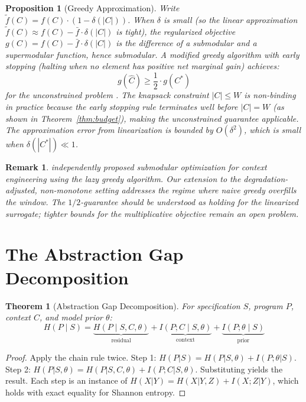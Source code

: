 \documentclass[11pt, a4paper, logo, copyright]{googledeepmind}
\newtheorem{theorem}{Theorem}[section]
\newtheorem{proposition}{Proposition}[section]
\newtheorem*{remark}{Remark}
\begin{document}
\begin{proposition}[Greedy Approximation]
\label{thm:greedy}
Write $\tilde{f}(C) = f(C) \cdot (1 - \delta(|C|))$. When $\delta$ is small (so the linear approximation $\tilde{f}(C) \approx f(C) - \bar{f} \cdot \delta(|C|)$ is tight), the regularized objective $g(C) = f(C) - \bar{f} \cdot \delta(|C|)$ is the difference of a submodular and a supermodular function, hence submodular. A modified greedy algorithm with early stopping (halting when no element has positive net marginal gain) achieves:
$$g(\hat{C}) \geq \frac{1}{2} \cdot g(C^*)$$
for the unconstrained problem \citep{buchbinder2015tight}. The knapsack constraint $|C| \leq W$ is non-binding in practice because the early stopping rule terminates well before $|C| = W$ (as shown in Theorem~\ref{thm:budget}), making the unconstrained guarantee applicable. The approximation error from linearization is bounded by $O(\delta^2)$, which is small when $\delta(|C^*|) \ll 1$.
\end{proposition}

\begin{remark}
\citet{jina2025submodular} independently proposed submodular optimization for context engineering using the lazy greedy algorithm. Our extension to the degradation-adjusted, non-monotone setting addresses the regime where naive greedy overfills the window. The $1/2$-guarantee should be understood as holding for the linearized surrogate; tighter bounds for the multiplicative objective remain an open problem.
\end{remark}


\section{The Abstraction Gap Decomposition}
\label{sec:abstraction-gap}

\begin{theorem}[Abstraction Gap Decomposition]
\label{thm:decomposition}
For specification $S$, program $P$, context $C$, and model prior $\theta$:
$$H(P \mid S) = \underbrace{H(P \mid S, C, \theta)}_{\text{residual}} + \underbrace{I(P; C \mid S, \theta)}_{\text{context}} + \underbrace{I(P; \theta \mid S)}_{\text{prior}}$$
\end{theorem}

\begin{proof}
Apply the chain rule twice. Step 1: $H(P|S) = H(P|S,\theta) + I(P;\theta|S)$. Step 2: $H(P|S,\theta) = H(P|S,C,\theta) + I(P;C|S,\theta)$. Substituting yields the result. Each step is an instance of $H(X|Y) = H(X|Y,Z) + I(X;Z|Y)$, which holds with exact equality for Shannon entropy.
\end{proof}
\end{document}
